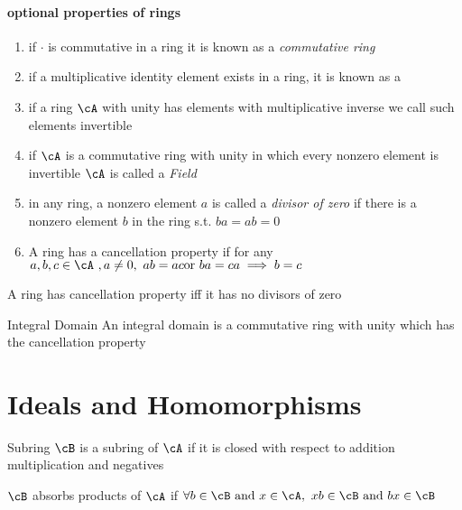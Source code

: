 \documentclass[11pt, oneside, dvipdfmx]{book}
\begin{document}
\paragraph{optional properties of rings}
\begin{enumerate}
\item if $\cdot$ is commutative in a ring it is known as a \textit{commutative ring}

\item if a multiplicative identity element exists in a ring, it is known as a 

\item if a ring $\cA$ with unity has elements with multiplicative inverse we call such elements invertible

\item if $\cA$ is a commutative ring with unity in which every nonzero element is invertible $\cA$ is called a \textit{Field}

\item in any ring, a nonzero element $a$ is called a \textit{divisor of zero} if there is a nonzero element $b$ in the ring s.t. $ba=ab=0$

\item A ring has a cancellation property if for any$a,b,c \in \cA~,a\neq 0,~ab=ac \text{or}~ba=ca \implies b=c$
\end{enumerate}

\begin{MyTheorem}
A ring has cancellation property iff it has no divisors of zero
\end{MyTheorem}

\begin{MyDefinition}{Integral Domain}
An integral domain is a commutative ring with unity which has the cancellation property
\end{MyDefinition}

\section{Ideals and Homomorphisms}
\begin{MyDefinition}{Subring}
$\cB$ is a subring of $\cA$ if it is closed with respect to addition multiplication and 
negatives
\end{MyDefinition}

\begin{description}
\item $\cB$ absorbs products of $\cA$ if $\forall b \in \cB ~\text{and}~ x \in \cA ,~xb \in \cB~\text{and}~ bx \in \cB $
\end{description}
\end{document}
